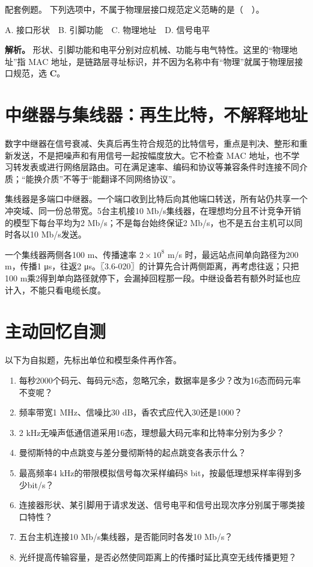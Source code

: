 \begin{example}[配套例题]

配套例题。 下列选项中，不属于物理层接口规范定义范畴的是（　）。

A. 接口形状　B. 引脚功能　C. 物理地址　D. 信号电平

\end{example}

\textbf{解析。} 形状、引脚功能和电平分别对应机械、功能与电气特性。这里的``物理地址''指 MAC 地址，是链路层寻址标识，并不因为名称中有``物理''就属于物理层接口规范，选 \textbf{C}。

\section{中继器与集线器：再生比特，不解释地址}\label{CN02-08}

数字中继器在信号衰减、失真后再生符合规范的比特信号，重点是判决、整形和重新发送，不是把噪声和有用信号一起按幅度放大。它不检查 MAC 地址，也不学习转发表或进行网络层路由。可在满足速率、编码和协议等兼容条件时连接不同介质；``能换介质''不等于``能翻译不同网络协议''。

集线器是多端口中继器。一个端口收到比特后向其他端口转送，所有站仍共享一个冲突域、同一份总带宽。5台主机接10 Mb/s集线器，在理想均分且不计竞争开销的模型下每台平均为2 Mb/s；不是每台始终保证2 Mb/s，也不是五台主机可以同时各以10 Mb/s发送。

一个集线器两侧各100 m、传播速率 \(2\times10^8\) m/s 时，最远站点间单向路径为200 m，传播1 μs，往返2 μs。〖3.6-020〗的计算先合计两侧距离，再考虑往返；只把100 m乘2得到单向路径就停下，会漏掉回程那一段。中继设备若有额外时延也应计入，不能只看电缆长度。

\section{主动回忆自测}\label{CN02-review}

以下为自拟题，先标出单位和模型条件再作答。

\begin{enumerate}
\def\labelenumi{\arabic{enumi}.}
\tightlist
\item
  每秒2000个码元、每码元8态，忽略冗余，数据率是多少？改为16态而码元率不变呢？
\item
  频率带宽1 MHz、信噪比30 dB，香农式应代入30还是1000？
\item
  2 kHz无噪声低通信道采用16态，理想最大码元率和比特率分别为多少？
\item
  曼彻斯特的中点跳变与差分曼彻斯特的起点跳变各表示什么？
\item
  最高频率4 kHz的带限模拟信号每次采样编码8 bit，按最低理想采样率得到多少bit/s？
\item
  连接器形状、某引脚用于请求发送、信号电平和信号出现次序分别属于哪类接口特性？
\item
  五台主机连接10 Mb/s集线器，是否能同时各发10 Mb/s？
\item
  光纤提高传输容量，是否必然使同距离上的传播时延比真空无线传播更短？
\end{enumerate}

